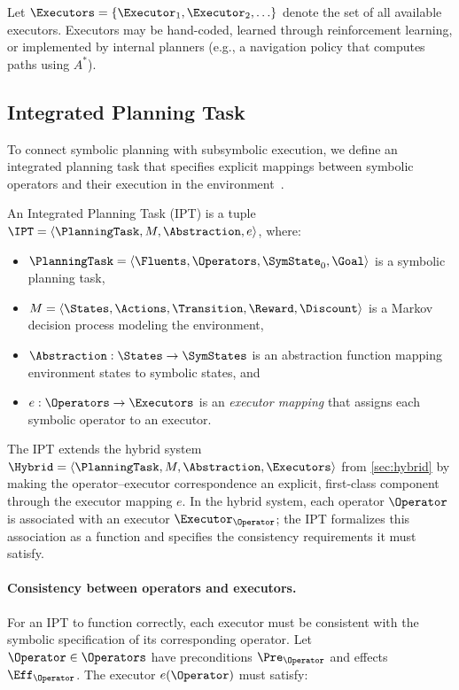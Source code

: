 Let $\Executors = \{\Executor_1, \Executor_2, \ldots\}$ denote the set of all available executors. Executors may be hand-coded, learned through reinforcement learning, or implemented by internal planners (e.g., a navigation policy that computes paths using $A^*$).

\subsection{Integrated Planning Task}
\label{sec:ipt_def}

To connect symbolic planning with subsymbolic execution, we define an integrated planning task that specifies explicit mappings between symbolic operators and their execution in the environment~\cite{sarathy2021spotter}.

\begin{definition}
\label{def:ipt}
An Integrated Planning Task (IPT) is a tuple $\IPT = \langle \PlanningTask, M, \Abstraction, e \rangle$, where:
\begin{itemize}[leftmargin=*]
    \item $\PlanningTask = \langle \Fluents, \Operators, \SymState_0, \Goal \rangle$ is a symbolic planning task,
    \item $M = \langle \States, \Actions, \Transition, \Reward, \Discount \rangle$ is a Markov decision process modeling the environment,
    \item $\Abstraction : \States \rightarrow \SymStates$ is an abstraction function mapping environment states to symbolic states, and
    \item $e : \Operators \rightarrow \Executors$ is an \emph{executor mapping} that assigns each symbolic operator to an executor.
\end{itemize}
\end{definition}


The IPT extends the hybrid system $\Hybrid = \langle \PlanningTask, M, \Abstraction, \Executors \rangle$ from \cref{sec:hybrid} by making the operator--executor correspondence an explicit, first-class component through the executor mapping $e$. In the hybrid system, each operator $\Operator$ is associated with an executor $\Executor_\Operator$; the IPT formalizes this association as a function and specifies the consistency requirements it must satisfy.

\paragraph{Consistency between operators and executors.}
For an IPT to function correctly, each executor must be consistent with the symbolic specification of its corresponding operator. Let $\Operator \in \Operators$ have preconditions $\Pre_{\Operator}$ and effects $\Eff_{\Operator}$. The executor $e(\Operator)$ must satisfy:


